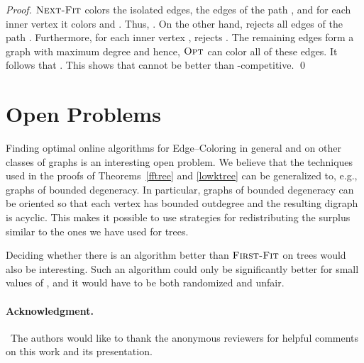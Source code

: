 \documentclass[smallextended]{svjour3}
\def\mck{{\sc Edge--Coloring}\xspace}
\newcommand{\NF}{\ensuremath{\operatorname{\textsc{Next-Fit}}}\xspace}
\newcommand{\FF}{\ensuremath{\operatorname{\textsc{First-Fit}}}\xspace}
\newcommand{\OPT}{\ensuremath{\operatorname{\textsc{Opt}}}\xspace}
\begin{document}
\begin{proof}
\NF colors the  isolated edges, the  edges of the path , and for each inner vertex  it colors  and . Thus, . On the other hand,  
rejects all edges of the path . Furthermore, for each inner vertex ,  rejects .
The remaining edges form a graph with maximum degree  and hence, \OPT can color all of these  edges.
It follows that . This shows that  cannot be better than -competitive.
\qed\end{proof}


\section{Open Problems}
Finding optimal online algorithms for \mck in general and on other classes of graphs is an interesting open problem. We believe that the techniques used in the proofs of Theorems~\ref{fftree} and \ref{lowktree} can be generalized to, e.g., graphs of bounded degeneracy. In particular, graphs of bounded degeneracy can be oriented so that each vertex has bounded outdegree and the resulting digraph is acyclic. This makes it possible to use strategies for redistributing the surplus similar to the ones we have used for trees.

Deciding whether there is an algorithm better than \FF on trees would
also be interesting.
Such an algorithm could only be significantly better for small values
of , and it would have to be both randomized and unfair.

\paragraph*{Acknowledgment.}
~The authors would like to thank the anonymous reviewers for helpful comments on this work and its presentation.




\end{document}
